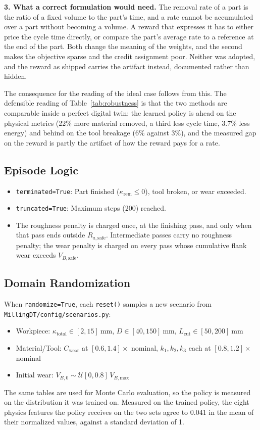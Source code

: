 \documentclass[11pt,a4paper]{article}
\newcommand{\RaSafe}{R_{a,\text{safe}}}
\newcommand{\VBSafe}{V_{B,\text{safe}}}
\newcommand{\VBMax}{V_{B,\text{max}}}
\begin{document}
\textbf{3. What a correct formulation would need.} The removal rate of a part is the ratio of a fixed volume to the part's time, and a rate cannot be accumulated over a part without becoming a volume. A reward that expresses it has to either price the cycle time directly, or compare the part's average rate to a reference at the end of the part. Both change the meaning of the weights, and the second makes the objective sparse and the credit assignment poor. Neither was adopted, and the reward as shipped carries the artifact instead, documented rather than hidden.

The consequence for the reading of the ideal case follows from this. The defensible reading of Table~\ref{tab:robustness} is that the two methods are comparable inside a perfect digital twin: the learned policy is ahead on the physical metrics (22\% more material removed, a third less cycle time, 3.7\% less energy) and behind on the tool breakage (6\% against 3\%), and the measured gap on the reward is partly the artifact of how the reward pays for a rate.

\subsection{Episode Logic}
\begin{itemize}
    \item \texttt{terminated=True}: Part finished ($\kappa_\text{rem} \le 0$), tool broken, or wear exceeded.
    \item \texttt{truncated=True}: Maximum steps (200) reached.
    \item The roughness penalty is charged once, at the finishing pass, and only when that pass ends outside $\RaSafe$. Intermediate passes carry no roughness penalty; the wear penalty is charged on every pass whose cumulative flank wear exceeds $\VBSafe$.
\end{itemize}

\subsection{Domain Randomization}
When \texttt{randomize=True}, each \texttt{reset()} samples a new scenario from \texttt{MillingDT/\allowbreak config/\allowbreak scenarios.py}:
\begin{itemize}
    \item Workpiece: $\kappa_\text{total} \in [2, 15]\ \text{mm}$, $D \in [40, 150]\ \text{mm}$, $L_\text{cut} \in [50, 200]\ \text{mm}$
    \item Material/Tool: $C_\text{wear}$ at $[0.6, 1.4]\times$ nominal, $k_1, k_2, k_3$ each at $[0.8, 1.2]\times$ nominal
    \item Initial wear: $V_{B,0} \sim \mathcal{U}[0, 0.8]\,\VBMax$
\end{itemize}
The same tables are used for Monte Carlo evaluation, so the policy is measured on the distribution it was trained on. Measured on the trained policy, the eight physics features the policy receives on the two sets agree to 0.041 in the mean of their normalized values, against a standard deviation of 1.
\end{document}
